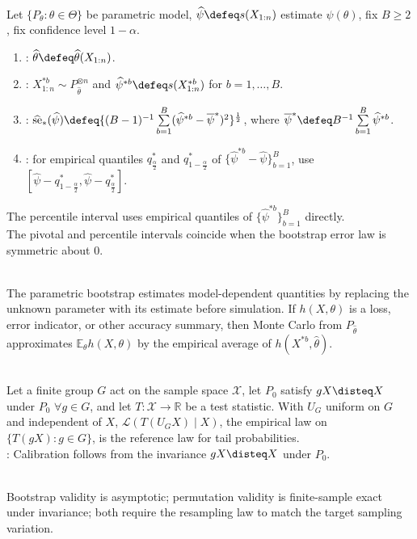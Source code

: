 \begin{method} \label{meth:parametric-bootstrap-standard-errors-and-intervals} \\
Let $\{P_\theta:\theta\in\Theta\}$ be parametric model, $\widehat{\psi}\defeq s(X_{1:n})$ estimate $\psi(\theta)$, fix $B\geq2$, fix confidence level $1-\alpha$.
\begin{enumerate}[label=(\roman*)]
\setlength{\itemsep}{0pt}
\item {}: $\widehat{\theta}\defeq\widehat{\theta}(X_{1:n})$.
\item {}: $X_{1:n}^{\ast b}\sim P_{\widehat{\theta}}^{\otimes n}$ and $\widehat{\psi}^{\ast b}\defeq s(X_{1:n}^{\ast b})$ for $b=1,\ldots,B$.
\item {}: $\widehat{\operatorname{se}}_\ast(\widehat{\psi})\defeq\{(B-1)^{-1}\sum\limits_{b=1}^{B}(\widehat{\psi}^{\ast b}-\overline{\psi}^{\ast})^2\}^{\frac{1}{2}}$, where $\overline{\psi}^{\ast}\defeq B^{-1}\sum\limits_{b=1}^{B}\widehat{\psi}^{\ast b}$.
\item {}: for empirical quantiles $q_{\frac{\alpha}{2}}^\ast$ and $q_{1-\frac{\alpha}{2}}^\ast$ of $\{\widehat{\psi}^{\ast b}-\widehat{\psi}\}_{b=1}^{B}$, use $[\widehat{\psi}-q_{1-\frac{\alpha}{2}}^\ast,\widehat{\psi}-q_{\frac{\alpha}{2}}^\ast]$.
\end{enumerate}
The percentile interval uses empirical quantiles of $\{\widehat{\psi}^{\ast b}\}_{b=1}^{B}$ directly.\\
The pivotal and percentile intervals coincide when the bootstrap error law is symmetric about $0$.
\end{method}

\begin{remark} \label{rem:parametric-bootstrap-plug-in-principle} \\
The parametric bootstrap estimates model-dependent quantities by replacing the unknown parameter with its estimate before simulation. If $h(X,\theta)$ is a loss, error indicator, or other accuracy summary, then Monte Carlo from $P_{\widehat{\theta}}$ approximates $\mathbb{E}_\theta h(X,\theta)$ by the empirical average of $h(X^{\ast b},\widehat{\theta})$.
\end{remark}

\begin{definition} \label{def:permutation-test} \\
Let a finite group $G$ act on the sample space $\mathcal{X}$, let $P_0$ satisfy $gX\disteq X$ under $P_0$ $\forall g\in G$, and let $T:\mathcal{X}\to\mathbb{R}$ be a test statistic. With $U_G$ uniform on $G$ and independent of $X$, $\mathcal{L}(T(U_GX)\mid X)$, the empirical law on $\{T(gX):g\in G\}$, is the reference law for tail probabilities.\\
: Calibration follows from the invariance $gX\disteq X$ under $P_0$.
\end{definition}

\begin{remark} \label{rem:resampling-validity} \\
Bootstrap validity is asymptotic; permutation validity is finite-sample exact under invariance; both require the resampling law to match the target sampling variation.
\end{remark}
